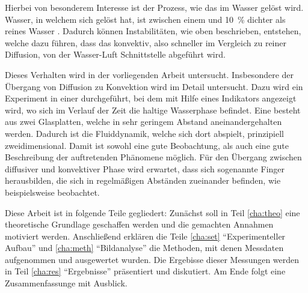Hierbei von besonderem Interesse ist der Prozess, wie das \COT im Wasser gelöst wird.
Wasser, in welchem sich \COT gelöst hat, ist zwischen einem und \SI{10}{\percent} dichter als reines Wasser \citep{garcia}. Dadurch können Instabilitäten, wie oben beschrieben, entstehen, welche dazu führen, dass das \COT konvektiv, also schneller im Vergleich zu reiner Diffusion, von der Wasser-Luft Schnittstelle abgeführt wird.

Dieses Verhalten wird in der vorliegenden Arbeit untersucht. Insbesondere der Übergang von Diffusion zu Konvektion wird im Detail untersucht.
Dazu wird ein Experiment in einer \HSC durchgeführt, bei dem mit Hilfe eines Indikators angezeigt wird, wo sich im Verlauf der Zeit die \COTm haltige Wasserphase befindet. 
Eine \HSC besteht aus zwei Glasplatten, welche in sehr geringem Abstand aneinandergehalten werden. Dadurch ist die Fluiddynamik, welche sich dort abspielt, prinzipiell zweidimensional. Damit ist sowohl eine gute Beobachtung, als auch eine gute Beschreibung der auftretenden Phänomene möglich.
Für den Übergang zwischen diffusiver und konvektiver Phase wird erwartet, dass sich sogenannte Finger herausbilden, die sich in regelmäßigen Abständen zueinander befinden, wie beispielsweise \cite{fernandez} beobachtet.

Diese Arbeit ist in folgende Teile gegliedert: Zunächst soll in Teil \ref{cha:theo} eine theoretische Grundlage geschaffen werden und die gemachten Annahmen motiviert werden. Anschließend erklären die Teile \ref{cha:set} "`Experimenteller Aufbau"' und \ref{cha:meth} "`Bildanalyse"' die Methoden, mit denen Messdaten aufgenommen und ausgewertet wurden. Die Ergebisse dieser Messungen werden in Teil \ref{cha:res} "`Ergebnisse"' präsentiert und diskutiert. Am Ende folgt eine Zusammenfassunge mit Ausblick.

